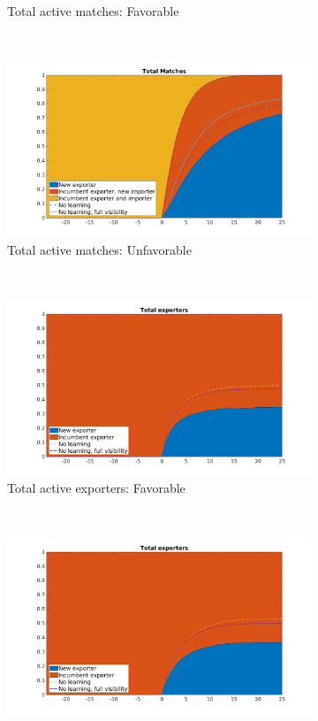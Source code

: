 \documentclass[12pt]{article}
\begin{document}
\begin{figure}[tbp]
\begin{subfigure}[b]{0.45\textwidth}
        \caption{Total active matches: Favorable}
    \end{subfigure} ~ 
\begin{subfigure}[b]{0.45\textwidth}
        \centering
        \includegraphics[width=\textwidth]{figures/total_matches_pct_unf_comb}
        \caption{Total active matches: Unfavorable}
    \end{subfigure} \newline
~ 
\begin{subfigure}[b]{0.45\textwidth}
        \centering
        \includegraphics[width=\textwidth]{figures/total_firms_pct_comb}
        \caption{Total active exporters: Favorable}
    \end{subfigure} ~ 
\begin{subfigure}[b]{0.45\textwidth}
        \centering
        \includegraphics[width=\textwidth]{figures/total_firms_pct_unf_comb}

\end{subfigure}
\end{figure}
\end{document}

